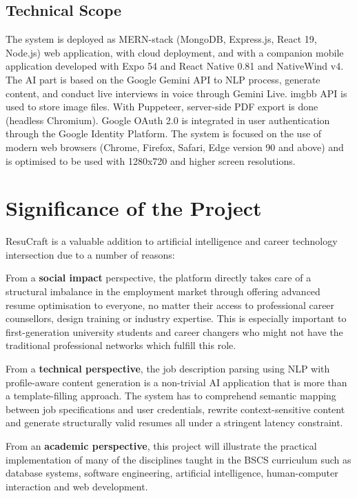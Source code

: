 \documentclass[12pt, a4paper, oneside]{report}
\begin{document}
\subsection{Technical Scope}
The system is deployed as MERN-stack (MongoDB, Express.js, React 19, Node.js) web application, with cloud deployment, and with a companion mobile application developed with Expo 54 and React Native 0.81 and NativeWind v4. The AI part is based on the Google Gemini API\cite{gemini2023} to NLP process, generate content, and conduct live interviews in voice through Gemini Live\cite{geminidocs2024}. imgbb API is used to store image files\cite{imgbb2024}. With Puppeteer, server-side PDF export is done\cite{puppeteer2024} (headless Chromium). Google OAuth 2.0 is integrated in user authentication\cite{oauth2012} through the Google Identity Platform. The system is focused on the use of modern web browsers (Chrome, Firefox, Safari, Edge version 90 and above) and is optimised to be used with 1280x720 and higher screen resolutions.

\section{Significance of the Project}

ResuCraft is a valuable addition to artificial intelligence and career technology intersection due to a number of reasons:

From a \textbf{social impact} perspective, the platform directly takes care of a structural imbalance in the employment market\cite{topresume2021} through offering advanced resume optimisation to everyone, no matter their access to professional career counsellors, design training or industry expertise. This is especially important to first-generation university students and career changers who might not have the traditional professional networks which fulfill this role.

From a \textbf{technical perspective}, the job description parsing using NLP\cite{qin2018} with profile-aware content generation \cite{gemini2023} is a non-trivial AI application that is more than a template-filling approach. The system has to comprehend semantic mapping between job specifications and user credentials, rewrite context-sensitive content and generate structurally valid resumes all under a stringent latency constraint.

From an \textbf{academic perspective}, this project will illustrate the practical implementation of many of the disciplines taught in the BSCS curriculum such as database systems, software engineering\cite{pressman2014}, artificial intelligence, human-computer interaction and web development.
\end{document}
